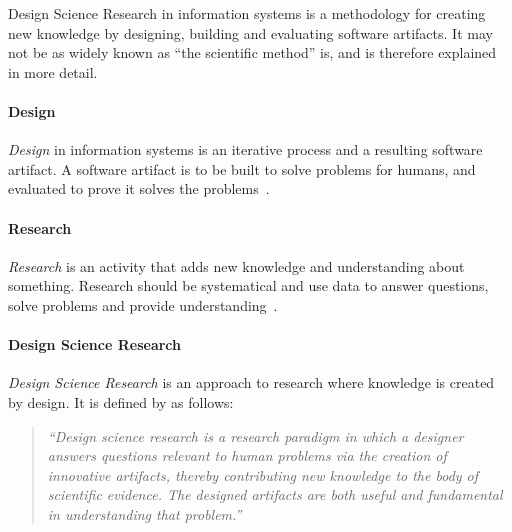 
Design Science Research in information systems is a methodology for creating new knowledge by designing, building and evaluating software \glspl{artifact}.
It may not be as widely known as ``the scientific method'' is, and is therefore explained in more detail.

\paragraph{Design}
\textit{Design} in information systems is an iterative process and a resulting software artifact. A software artifact is to be built to solve problems for humans, and evaluated to prove it solves the problems~\cite[p.~2]{alanhevnerDesignResearchInformation2010}.


\paragraph{Research}
\textit{Research} is an activity that adds new knowledge and understanding about something.
Research should be systematical and use data to answer questions, solve problems and provide understanding~\cite[p.~2,3]{alanhevnerDesignResearchInformation2010}.

\paragraph{Design Science Research}
\textit{Design Science Research} is an approach to research where knowledge is created by design.
It is defined by \textcite[p.~5]{alanhevnerDesignResearchInformation2010} as follows:

\begin{quote}
  \textit{``Design science research is a research paradigm in which a designer answers questions relevant to human problems via the creation of innovative artifacts, thereby contributing new knowledge to the body of scientific evidence.
  The designed artifacts are both useful and fundamental in understanding that problem.''}
\end{quote}

